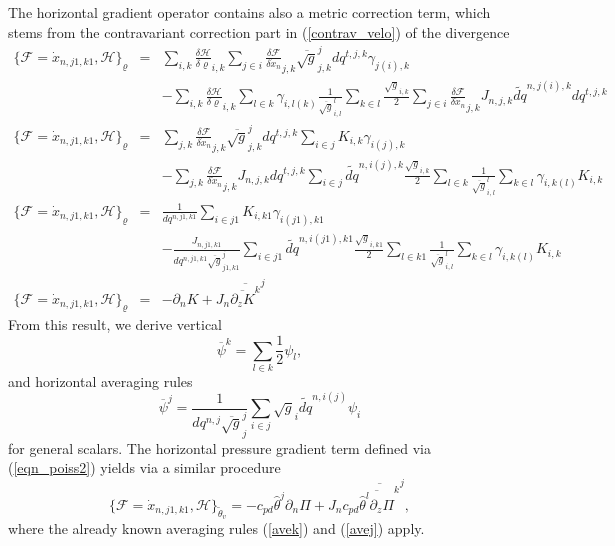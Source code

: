The horizontal gradient operator contains also a metric correction term, 
which stems from the contravariant correction part in (\ref{contrav_velo}) 
of the divergence
\begin{eqnarray*}
 \{\mathcal{F}=\dot{x}_{n,j1,k1},\mathcal{H}\}_\varrho&=&
\sum_{i,k}\frac{\delta\mathcal{H}}{\delta\varrho}_{i,k}\sum_{j\in i}\frac{\delta\mathcal{F}}{\delta \dot{x}_n}_{j,k}
\overline{\sqrt{g}}^j_{j,k}dq^{t,j,k}\gamma_{j(i),k}\\&&
-\sum_{i,k}\frac{\delta\mathcal{H}}{\delta\varrho}_{i,k}
\sum_{l\in k}\gamma_{i,l(k)}\frac{1}{\overline{\sqrt{g}}^l_{i,l}}\sum_{k\in l}\frac{\sqrt{g}_{i,k}}{2}\sum_{j\in i}
\frac{\delta\mathcal{F}}{\delta \dot{x}_n}_{j,k} J_{n,j,k}\widetilde{dq}^{n,j(i),k}dq^{t,j,k}\\
 \{\mathcal{F}=\dot{x}_{n,j1,k1},\mathcal{H}\}_\varrho&=&
\sum_{j,k}\frac{\delta\mathcal{F}}{\delta \dot{x}_n}_{j,k}\overline{\sqrt{g}}^j_{j,k}dq^{t,j,k}\sum_{i\in j}
K_{i,k}\gamma_{i(j),k}\\&&
-\sum_{j,k}\frac{\delta\mathcal{F}}{\delta \dot{x}_n}_{j,k}J_{n,j,k}dq^{t,j,k}
\sum_{i\in j}\widetilde{dq}^{n,i(j),k}\frac{\sqrt{g}_{i,k}}{2}
\sum_{l\in k}\frac{1}{\overline{\sqrt{g}}^l_{i,l}}
\sum_{k\in l}\gamma_{i,k(l)}K_{i,k}\\
\{\mathcal{F}=\dot{x}_{n,j1,k1},\mathcal{H}\}_\varrho&=&\frac{1}{dq^{n,j1,k1}}\sum_{i\in j1}K_{i,k1}\gamma_{i(j1),k1}\\
&&-\frac{J_{n,j1,k1}}{dq^{n,j1,k1}\overline{\sqrt{g}}^j_{j1,k1}}
\sum_{i\in j1}\widetilde{dq}^{n,i(j1),k1}\frac{\sqrt{g}_{i,k1}}{2}
\sum_{l\in k1}\frac{1}{\overline{\sqrt{g}}^l_{i,l}}
\sum_{k\in l}\gamma_{i,k(l)}K_{i,k}\\
\{\mathcal{F}=\dot{x}_{n,j1,k1},\mathcal{H}\}_\varrho&=&
-\partial_{n}K+J_n\overline{\overline{\partial_zK}^k}^j
\end{eqnarray*}
From this result, we derive vertical
\begin{equation}
        \overline{\psi}^k=\sum_{l\in k}\frac{1}{2}\psi_l,
       \label{avek}
\end{equation}
and horizontal averaging rules
\begin{equation}
        \overline{\psi}^j=\frac{1}{dq^{n,j}\overline{\sqrt{g}}^j_{j}}\sum_{i\in j}
        \sqrt{g}_i\widetilde{dq}^{n,i(j)}\psi_i
       \label{avej}
\end{equation}
for general scalars. The horizontal pressure gradient term defined via (\ref{eqn_poiss2}) yields via a similar procedure
\begin{displaymath}
 \{\mathcal{F}=\dot{x}_{n,j1,k1},\mathcal{H}\}_{\tilde\theta_v}=
-c_{pd}\hat{\theta}^j\partial_{n}\Pi+J_nc_{pd}\overline{\overline{\hat\theta^l\partial_z\Pi}^k}^j,
\end{displaymath}
where the already known averaging rules (\ref{avek}) and (\ref{avej}) apply.

